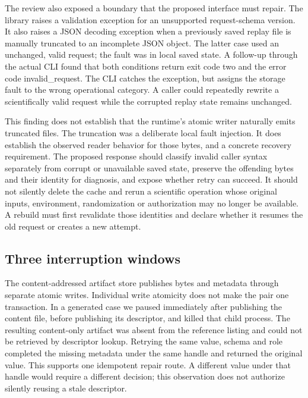 The review also exposed a boundary that the proposed interface must repair.
The library raises a validation exception for an unsupported request-schema
version. It also raises a JSON decoding exception when a previously saved replay
file is manually truncated to an incomplete JSON object. The latter case used
an unchanged, valid request; the fault was in local saved state. A follow-up
through the actual CLI found that both conditions return exit code two and
the error code invalid\_request. The CLI catches the exception, but assigns
the storage fault to the wrong operational category. A caller could repeatedly
rewrite a scientifically valid request while the corrupted replay state remains
unchanged. \citep{exec14_failure_observations}

This finding does not establish that the runtime's atomic writer naturally emits
truncated files. The truncation was a deliberate local fault injection. It does
establish the observed reader behavior for those bytes, and a concrete recovery
requirement. The proposed response should classify invalid caller syntax
separately from corrupt or unavailable saved state, preserve the offending bytes
and their identity for diagnosis, and expose whether retry can succeed. It should
not silently delete the cache and rerun a scientific operation whose original
inputs, environment, randomization or authorization may no longer be available.
A rebuild must first revalidate those identities and declare whether it resumes
the old request or creates a new attempt. \citep{exec14_failure_design}

\subsection{Three interruption windows}

The content-addressed artifact store publishes bytes and metadata through
separate atomic writes. Individual write atomicity does not make the pair one
transaction. In a generated case we paused immediately after publishing the
content file, before publishing its descriptor, and killed that child process.
The resulting content-only artifact was absent from the reference listing and
could not be retrieved by descriptor lookup. Retrying the same value, schema
and role completed the missing metadata under the same handle and returned the
original value. This supports one idempotent repair route. A different value
under that handle would require a different decision; this observation does not
authorize silently reusing a stale descriptor. \citep{exec14_failure_observations}

